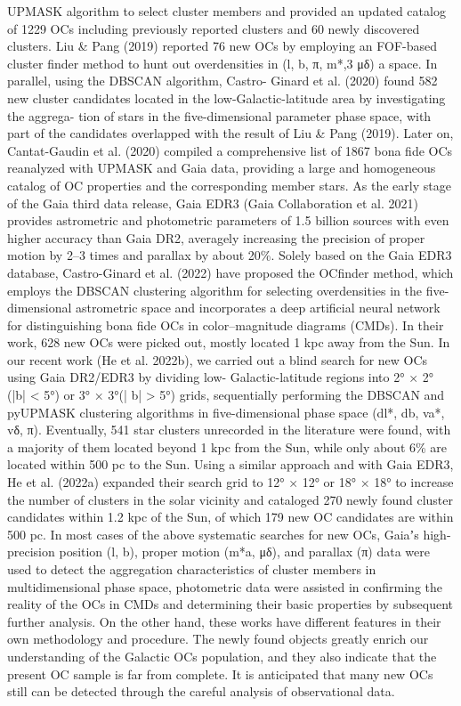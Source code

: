 \documentclass[../Main.tex]{subfiles}
\begin{document}
UPMASK algorithm to select cluster members and provided an
updated catalog of 1229 OCs including previously reported
clusters and 60 newly discovered clusters. Liu & Pang (2019)
reported 76 new OCs by employing an FOF-based cluster
finder method to hunt out overdensities in (l, b, π, m*,3 μδ) a
space. In parallel, using the DBSCAN algorithm, Castro- Ginard et al. (2020) found 582 new cluster candidates located in the low-Galactic-latitude area by investigating the aggrega- tion of stars in the five-dimensional parameter phase space, with part of the candidates overlapped with the result of Liu & Pang (2019). Later on, Cantat-Gaudin et al. (2020) compiled a comprehensive list of 1867 bona fide OCs reanalyzed with UPMASK and Gaia data, providing a large and homogeneous catalog of OC properties and the corresponding member stars. As the early stage of the Gaia third data release, Gaia EDR3 (Gaia Collaboration et al. 2021) provides astrometric and photometric parameters of 1.5 billion sources with even higher accuracy than Gaia DR2, averagely increasing the precision of proper motion by 2–3 times and parallax by about 20\%. Solely based on the Gaia EDR3 database, Castro-Ginard et al. (2022) have proposed the OCfinder method, which employs the DBSCAN clustering algorithm for selecting overdensities in the five-dimensional astrometric space and incorporates a deep artificial neural network for distinguishing bona fide OCs in color–magnitude diagrams (CMDs). In their work, 628 new OCs were picked out, mostly located 1 kpc away from the Sun. In our recent work (He et al. 2022b), we carried out a blind search for new OCs using Gaia DR2/EDR3 by dividing low- Galactic-latitude regions into 2° × 2° (|b| < 5°) or 3° × 3°(| b| > 5°) grids, sequentially performing the DBSCAN and pyUPMASK clustering algorithms in five-dimensional phase space (dl*, db, va*, vδ, π). Eventually, 541 star clusters unrecorded in the literature were found, with a majority of them located beyond 1 kpc from the Sun, while only about 6\% are located within 500 pc to the Sun. Using a similar approach and with Gaia EDR3, He et al. (2022a) expanded their search grid to 12° × 12° or 18° × 18° to increase the number of clusters in the solar vicinity and cataloged 270 newly found cluster candidates within 1.2 kpc of the Sun, of which 179 new OC candidates are within 500 pc.
In most cases of the above systematic searches for new OCs, Gaiaʼs high-precision position (l, b), proper motion (m*a, μδ), and parallax (π) data were used to detect the aggregation characteristics of cluster members in multidimensional phase space, photometric data were assisted in confirming the reality of the OCs in CMDs and determining their basic properties by subsequent further analysis. On the other hand, these works have different features in their own methodology and procedure. The newly found objects greatly enrich our understanding of the Galactic OCs population, and they also indicate that the present OC sample is far from complete. It is anticipated that many new OCs still can be detected through the careful analysis of observational data.
\end{document}
